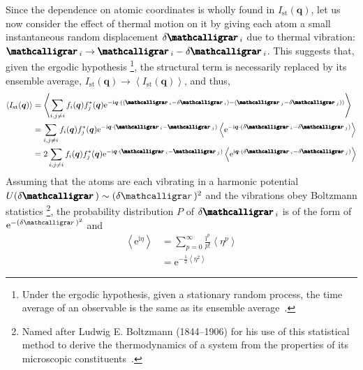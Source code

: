 Since the dependence on atomic coordinates is
wholly found in $I_\text{st}(\boldsymbol{q})$,
let us now consider the effect of thermal motion on it
by giving each atom a small instantaneous random displacement $\delta \bscriptr_i$
due to thermal vibration:
$\bscriptr_i \rightarrow \bscriptr_i - \delta \bscriptr_i$.
This suggests that, given the ergodic hypothesis%
\footnote{Under the ergodic hypothesis, given a stationary random process,
the time average of an observable is the same as its ensemble average~\cite{McQuarrieBook}.},
the structural term is necessarily replaced by its ensemble average,
$I_\text{st}(\boldsymbol{q}) \rightarrow \left< I_\text{st}(\boldsymbol{q}) \right>$,
and thus,
%
\begin{equation}
  \begin{aligned}
    \left< I_\text{st}(\boldsymbol{q}) \right>
      & = \left< \sum_{i, j \neq i} f_i(\boldsymbol{q}) f_j^*(\boldsymbol{q})
          \text{e}^{- \text{i} \boldsymbol{q} \cdot ( (\bscriptr_i - \delta \bscriptr_i) - (\bscriptr_j - \delta \bscriptr_j) )} \right> \\
      & = \sum_{i, j \neq i} f_i(\boldsymbol{q}) f_j^*(\boldsymbol{q}) \text{e}^{- \text{i} \boldsymbol{q} \cdot (\bscriptr_i - \bscriptr_j)}
          \left< \text{e}^{- \text{i} \boldsymbol{q} \cdot (\delta \bscriptr_i - \delta \bscriptr_j)} \right> \\
      & = 2 \sum_{i, j \neq i} f_i(\boldsymbol{q}) f_j^*(\boldsymbol{q}) \text{e}^{- \text{i} \boldsymbol{q} \cdot (\bscriptr_i - \bscriptr_j)}
          \left< \text{e}^{\text{i} \boldsymbol{q} \cdot (\delta \bscriptr_i - \delta \bscriptr_j)} \right>
  \end{aligned}
  \label{eq: <Ist>1}
\end{equation}
%
Assuming that the atoms are each vibrating in
a harmonic potential $U(\delta \bscriptr) \sim (\delta \scriptr)^2$ and
the vibrations obey Boltzmann statistics%
\footnote{Named after Ludwig E. Boltzmann (1844--1906) for
his use of this statistical method to derive
the thermodynamics of a system from
the properties of its microscopic constituents~\cite{McQuarrieBook}.},
the probability distribution $P$ of $\delta \bscriptr_i$
is of the form of $\text{e}^{-(\delta \scriptr)^2}$ and
%
\begin{equation}
  \begin{aligned}
    \left< \text{e}^{\text{i} \eta } \right>
      & = \sum_{p = 0}^\infty \frac{\text{i}^p}{p!} \left< \eta^p \right> \\
      & = \text{e}^{-\frac{1}{2} \left< \eta^2 \right> }
  \end{aligned}
\end{equation}
